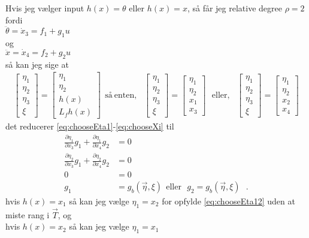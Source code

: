 Hvis jeg vælger input $h(x) = \theta$ eller $h(x) = x$, så får jeg relative degree $\rho = 2$ fordi\\
$\ddot{\theta} = \dot{x}_3 = f_1 + g_1 u$ \\
og\\
$\ddot{x} = \dot{x}_4 = f_2 + g_2 u$ \\
så kan jeg sige at 
\begin{align}
  \begin{bmatrix}
    \eta_1   \\
    \eta_2   \\
    \eta_3   \\
    \xi
  \end{bmatrix}
  =
  \begin{bmatrix}
    \eta_1   \\
    \eta_2   \\
    h(x)   \\
    L_f h(x)
  \end{bmatrix} \ \ \mathrm{så\ enten,} \ \ \ 
  \begin{bmatrix}
  \eta_1   \\
  \eta_2   \\
  \eta_3   \\
  \xi
  \end{bmatrix}
  =
  \begin{bmatrix}
  \eta_1   \\
  \eta_2   \\
  x_1   \\
  x_3
  \end{bmatrix} \ \ \ \mathrm{eller,} \ \ \
  \begin{bmatrix}
  \eta_1   \\
  \eta_2   \\
  \eta_3   \\
  \xi
  \end{bmatrix}
  =
  \begin{bmatrix}
  \eta_1   \\
  \eta_2   \\
  x_2   \\
  x_4
  \end{bmatrix}
\end{align}
det reducerer \autoref{eq:chooseEta1}-\ref{eq:chooseXi} til
\begin{align}
\frac{\partial \eta_1}{\partial x_3} g_1 + \frac{\partial \eta_1}{\partial x_4} g_2 &= 0                    \label{eq:chooseEta12}  \\
\frac{\partial \eta_2}{\partial x_3} g_1 + \frac{\partial \eta_2}{\partial x_4} g_2 &= 0                    \label{eq:chooseEta22}  \\
0 &= 0                    \label{eq:chooseEta32}  \\
g_1 &= g_b(\vec{\eta},\xi)  \ \ \mathrm{eller} \ \ \ g_2 = g_b(\vec{\eta},\xi)  \label{eq:chooseXi2} 
\ \ \ .
\end{align}
hvis $h(x) = x_1$ så kan jeg vælge $\eta_1 = x_2$ for opfylde \ref{eq:chooseEta12} uden at miste rang i $\vec{T}$, og \\
hvis $h(x) = x_2$ så kan jeg vælge $\eta_1 = x_1$

